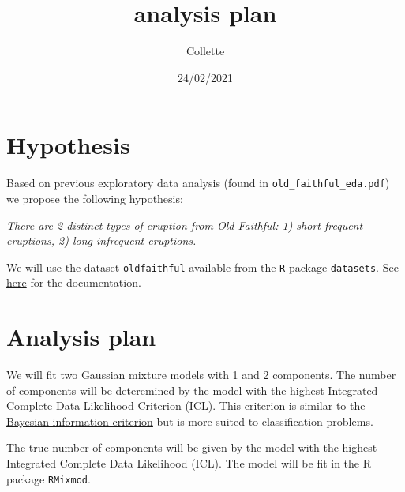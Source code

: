 \documentclass[]{article}
\title{analysis plan}
\author{Collette}
\date{24/02/2021}
\begin{document}
\maketitle

\hypertarget{hypothesis}{%
\section{Hypothesis}\label{hypothesis}}

Based on previous exploratory data analysis (found in
\texttt{old\_faithful\_eda.pdf}) we propose the following hypothesis:

\emph{There are 2 distinct types of eruption from Old Faithful: 1) short
frequent eruptions, 2) long infrequent eruptions.}

We will use the dataset \texttt{oldfaithful} available from the
\texttt{R} package \texttt{datasets}. See
\href{https://stat.ethz.ch/R-manual/R-devel/library/datasets/html/faithful.html}{here}
for the documentation.

\hypertarget{analysis-plan}{%
\section{Analysis plan}\label{analysis-plan}}

We will fit two Gaussian mixture models with 1 and 2 components. The
number of components will be deteremined by the model with the highest
Integrated Complete Data Likelihood Criterion (ICL). This criterion is
similar to the
\href{https://en.wikipedia.org/wiki/Bayesian_information_criterion}{Bayesian
information criterion} but is more suited to classification problems.

The true number of components will be given by the model with the
highest Integrated Complete Data Likelihood (ICL). The model will be fit
in the R package \texttt{RMixmod}.
\end{document}
